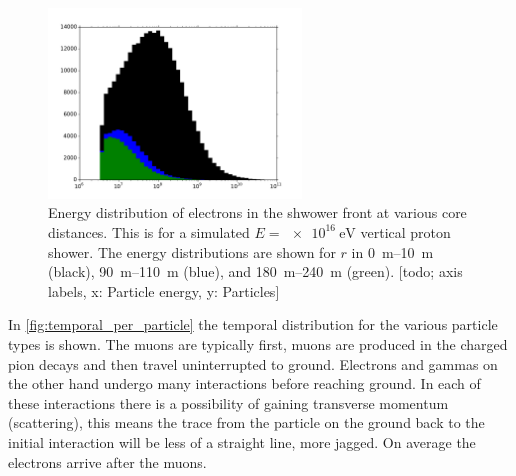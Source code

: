 \begin{figure}
    \centering
    \includegraphics[width=0.6\textwidth]
                    {plots/cosmic-rays/energy_front}
    \caption{Energy distribution of electrons in the shwower front at various core distances. This is for a simulated $E = \SI{e16}{\eV}$ vertical proton shower. The energy distributions are shown for $r$ in \SIrange{0}{10}{\meter} (black), \SIrange{90}{110}{\meter} (blue), and \SIrange{180}{240}{\meter} (green). \cite{heck2013corsika} [todo; axis labels, x: Particle energy, y: Particles]}
    \label{fig:energy_front}
\end{figure}


In \cref{fig:temporal_per_particle} the temporal distribution for the various particle types is shown. The muons are typically first, muons are produced in the charged pion decays and then travel uninterrupted to ground. Electrons and gammas on the other hand undergo many interactions before reaching ground. In each of these interactions there is a possibility of gaining transverse momentum (scattering), this means the trace from the particle on the ground back to the initial interaction will be less of a straight line, more jagged. On average the electrons arrive after the muons.

